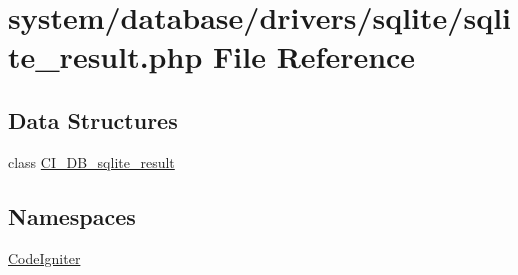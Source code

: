 \hypertarget{sqlite__result_8php}{}\section{system/database/drivers/sqlite/sqlite\+\_\+result.php File Reference}
\label{sqlite__result_8php}
\subsection*{Data Structures}
\begin{DoxyCompactItemize}
\item 
class \mbox{\hyperlink{class_c_i___d_b__sqlite__result}{C\+I\+\_\+\+D\+B\+\_\+sqlite\+\_\+result}}
\end{DoxyCompactItemize}
\subsection*{Namespaces}
\begin{DoxyCompactItemize}
\item 
 \mbox{\hyperlink{namespace_code_igniter}{Code\+Igniter}}
\end{DoxyCompactItemize}
